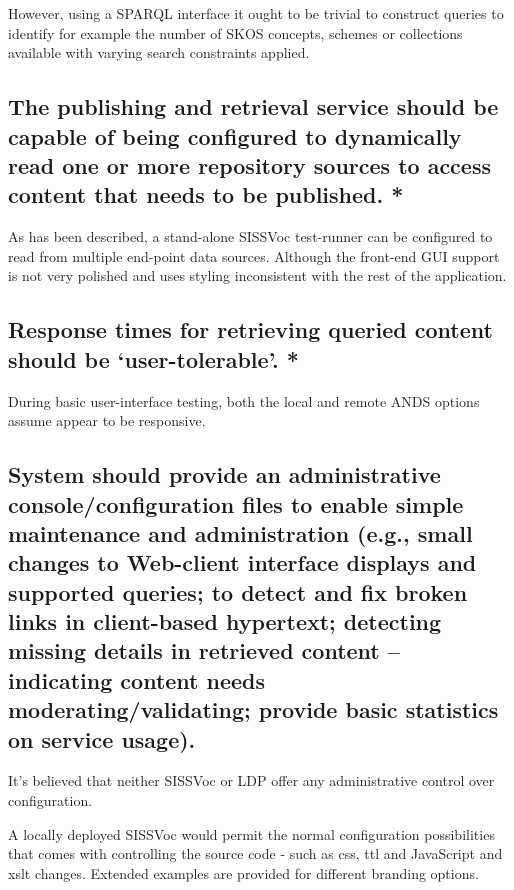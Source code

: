 \documentclass[10pt,a4paper]{article}
\begin{document}
\begin{flushleft}
  \item However, using a SPARQL interface it ought to be trivial to construct queries to identify
  for example the number of SKOS concepts, schemes or collections available with varying
  search constraints applied. 

\subsection{ The publishing and retrieval service should be capable of
being configured to dynamically read one or more repository sources to access
content that needs to be published. * }

  \item As has been described, a stand-alone SISSVoc test-runner can be configured to
  read from multiple end-point data sources. Although the front-end GUI support is not
  very polished and uses styling inconsistent with the rest of the
  application.


\subsection{ 
Response times for retrieving queried content should be ‘user-tolerable’. *
}

\item During basic user-interface testing, both the local and remote ANDS
options assume appear to be responsive.



\subsection{ System should provide an administrative console/configuration
files to enable simple maintenance and administration (e.g., small changes to
Web-client interface displays and supported queries; to detect and fix broken
links in client-based hypertext; detecting missing details in retrieved content
– indicating content needs moderating/validating; provide basic statistics on
service usage).
}

  \item It's believed that neither SISSVoc or LDP offer any administrative control over configuration. 

  \item A locally deployed SISSVoc would permit the normal configuration possibilities that comes with 
  controlling the source code - such as css, ttl and JavaScript and xslt changes. Extended examples are
  provided for different branding options.


\end{flushleft}
\end{document}

